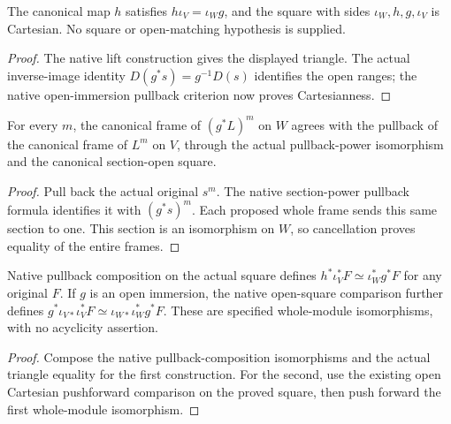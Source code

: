 \begin{lemma}
\label{lem:cech-line-native-open-square}
\leanok
The canonical map $h$ satisfies $h\iota_V=\iota_W g$, and the square
with sides $\iota_W,h,g,\iota_V$ is Cartesian. No square or open-matching
hypothesis is supplied.
\end{lemma}
\begin{proof}
The native lift construction gives the displayed triangle. The actual
inverse-image identity $D(g^*s)=g^{-1}D(s)$ identifies the open ranges;
the native open-immersion pullback criterion now proves Cartesianness.
\end{proof}

\begin{lemma}
\label{lem:cech-line-native-open-power-frame}
\leanok
For every $m$, the canonical frame of $(g^*L)^m$ on $W$ agrees with
the pullback of the canonical frame of $L^m$ on $V$, through the actual
pullback-power isomorphism and the canonical section-open square.
\end{lemma}
\begin{proof}
Pull back the actual original $s^m$. The native section-power pullback
formula identifies it with $(g^*s)^m$. Each proposed whole frame sends
this same section to one. This section is an isomorphism on $W$, so
cancellation proves equality of the entire frames.
\end{proof}

\begin{definition}
\label{def:cech-line-native-open-module-comparisons}
\leanok
Native pullback composition on the actual square defines
$h^*\iota_V^*F\simeq\iota_W^*g^*F$ for any original $F$.
If $g$ is an open immersion, the native open-square comparison further
defines $g^*\iota_{V*}\iota_V^*F\simeq\iota_{W*}\iota_W^*g^*F$.
These are specified whole-module isomorphisms, with no acyclicity assertion.
\end{definition}
\begin{proof}
Compose the native pullback-composition isomorphisms and the actual
triangle equality for the first construction. For the second, use the
existing open Cartesian pushforward comparison on the proved square,
then push forward the first whole-module isomorphism.
\end{proof}

